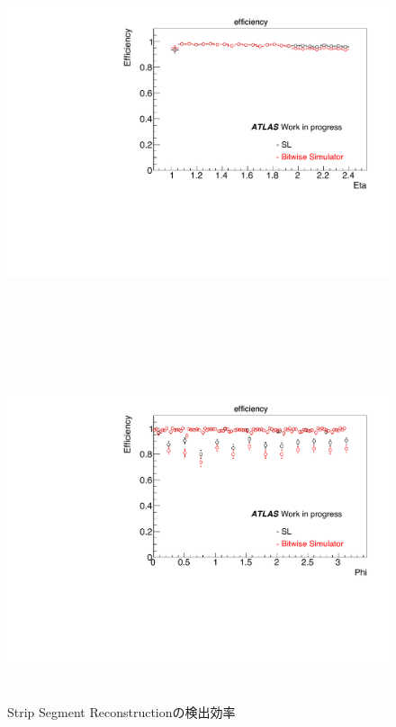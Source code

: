 \begin{figure}
\begin{minipage}[b]{\linewidth}
\centering
\includegraphics[height=10cm]{fig/Test/A_SM_strip_eta.pdf}
\end{minipage}\\
\begin{minipage}[b]{\linewidth}
\centering
\includegraphics[height=10cm]{fig/Test/A_SM_strip_phi.pdf}
\end{minipage}%
\caption[Strip Segment Reconstructionの検出効率]{Strip Segment Reconstructionの検出効率}
\label{SM_A_strip}
\end{figure}



